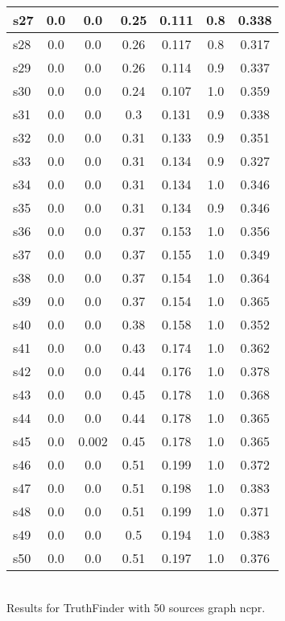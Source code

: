 \documentclass{article}
\begin{document}
\begin{tabular}{|l|c|c|c|c|c|c|}
\hline
s27 &0.0 & 0.0 & 0.25 & 0.111 & 0.8 & 0.338\\
\hline
s28 &0.0 & 0.0 & 0.26 & 0.117 & 0.8 & 0.317\\
\hline
s29 &0.0 & 0.0 & 0.26 & 0.114 & 0.9 & 0.337\\
\hline
s30 &0.0 & 0.0 & 0.24 & 0.107 & 1.0 & 0.359\\
\hline
s31 &0.0 & 0.0 & 0.3 & 0.131 & 0.9 & 0.338\\
\hline
s32 &0.0 & 0.0 & 0.31 & 0.133 & 0.9 & 0.351\\
\hline
s33 &0.0 & 0.0 & 0.31 & 0.134 & 0.9 & 0.327\\
\hline
s34 &0.0 & 0.0 & 0.31 & 0.134 & 1.0 & 0.346\\
\hline
s35 &0.0 & 0.0 & 0.31 & 0.134 & 0.9 & 0.346\\
\hline
s36 &0.0 & 0.0 & 0.37 & 0.153 & 1.0 & 0.356\\
\hline
s37 &0.0 & 0.0 & 0.37 & 0.155 & 1.0 & 0.349\\
\hline
s38 &0.0 & 0.0 & 0.37 & 0.154 & 1.0 & 0.364\\
\hline
s39 &0.0 & 0.0 & 0.37 & 0.154 & 1.0 & 0.365\\
\hline
s40 &0.0 & 0.0 & 0.38 & 0.158 & 1.0 & 0.352\\
\hline
s41 &0.0 & 0.0 & 0.43 & 0.174 & 1.0 & 0.362\\
\hline
s42 &0.0 & 0.0 & 0.44 & 0.176 & 1.0 & 0.378\\
\hline
s43 &0.0 & 0.0 & 0.45 & 0.178 & 1.0 & 0.368\\
\hline
s44 &0.0 & 0.0 & 0.44 & 0.178 & 1.0 & 0.365\\
\hline
s45 &0.0 & 0.002 & 0.45 & 0.178 & 1.0 & 0.365\\
\hline
s46 &0.0 & 0.0 & 0.51 & 0.199 & 1.0 & 0.372\\
\hline
s47 &0.0 & 0.0 & 0.51 & 0.198 & 1.0 & 0.383\\
\hline
s48 &0.0 & 0.0 & 0.51 & 0.199 & 1.0 & 0.371\\
\hline
s49 &0.0 & 0.0 & 0.5 & 0.194 & 1.0 & 0.383\\
\hline
s50 &0.0 & 0.0 & 0.51 & 0.197 & 1.0 & 0.376\\
\hline
\end{tabular}\\

\noindent Results for TruthFinder with 50 sources graph ncpr.
\end{document}
